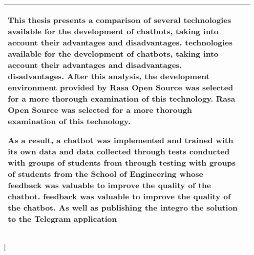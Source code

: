 \begin{@twocolumnfalse}
\begin{tabular}{p{6cm} p{10.3cm}}
			This thesis presents a comparison of several technologies available for the
			development of chatbots, taking into account their advantages and disadvantages.
			technologies available for the development of chatbots, taking into account
			their advantages and disadvantages.
			disadvantages. After this analysis, the development environment provided by
			Rasa Open Source was selected for a more thorough examination of this technology.
			Rasa Open Source was selected for a more thorough examination of this
			technology.

			As a result, a chatbot was implemented and trained with its own data and data collected
			through tests conducted with groups of students from
			through testing with groups of students from the School of Engineering
			whose feedback was valuable to improve the quality of the chatbot.
			feedback was valuable to improve the quality of the chatbot. As well as
			publishing the integro
			the solution to the Telegram application
			\\ \hline

		\end{tabular}

	\end{@twocolumnfalse}
]
